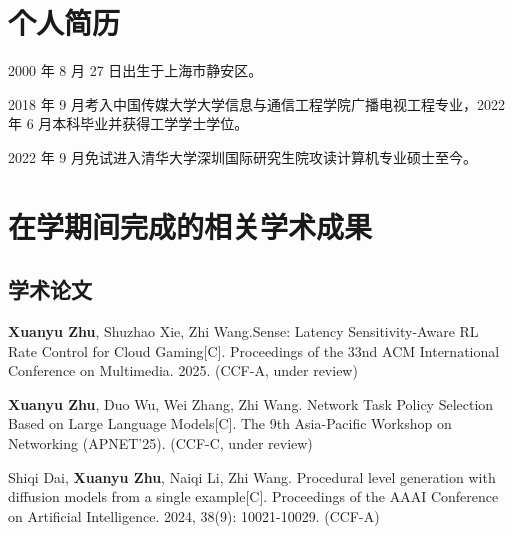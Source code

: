 
\begin{resume}

  \section*{个人简历}

  2000 年 8 月 27 日出生于上海市静安区。

  2018 年 9 月考入中国传媒大学大学信息与通信工程学院广播电视工程专业，2022 年 6 月本科毕业并获得工学学士学位。

  2022 年 9 月免试进入清华大学深圳国际研究生院攻读计算机专业硕士至今。


  \section*{在学期间完成的相关学术成果}

  \subsection*{学术论文}

  \begin{achievements}
    \item \textbf{Xuanyu Zhu}, Shuzhao Xie, Zhi Wang.Sense: Latency Sensitivity-Aware RL Rate Control for Cloud Gaming[C]. Proceedings of the 33nd ACM International Conference on Multimedia. 2025. (CCF-A, under review)
    
    \item \textbf{Xuanyu Zhu}, Duo Wu, Wei Zhang, Zhi Wang. Network Task Policy Selection Based on Large Language Models[C]. The 9th Asia-Pacific Workshop on Networking (APNET'25). (CCF-C, under review)
    
    \item Shiqi Dai, \textbf{Xuanyu Zhu}, Naiqi Li, Zhi Wang. Procedural level generation with diffusion models from a single example[C]. Proceedings of the AAAI Conference on Artificial Intelligence. 2024, 38(9): 10021-10029. (CCF-A)

  \end{achievements}
\end{resume}
